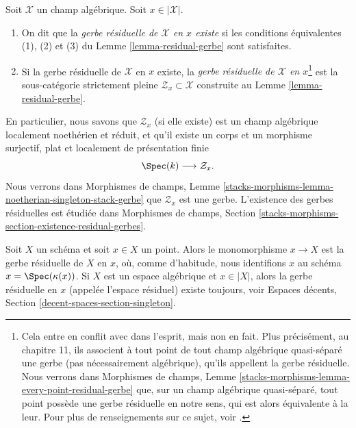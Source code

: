 \begin{definition}
\label{definition-residual-gerbe}
Soit $\mathcal{X}$ un champ algébrique. Soit $x \in |\mathcal{X}|$.
\begin{enumerate}
\item On dit que la {\it gerbe résiduelle de $\mathcal{X}$ en $x$ existe}
si les conditions équivalentes (1), (2) et (3) du
Lemme \ref{lemma-residual-gerbe}
sont satisfaites.
\item Si la gerbe résiduelle de $\mathcal{X}$ en $x$ existe, la
{\it gerbe résiduelle de $\mathcal{X}$ en $x$}\footnote{Cela entre en conflit avec
\cite{LM-B} dans l'esprit, mais non en fait. Plus précisément, au chapitre 11, ils associent
à tout point de tout champ algébrique quasi-séparé une gerbe (pas nécessairement
algébrique), qu'ils appellent la gerbe résiduelle. Nous verrons dans
Morphismes de champs, Lemme
\ref{stacks-morphisms-lemma-every-point-residual-gerbe}
que, sur un champ algébrique quasi-séparé, tout point
possède une gerbe résiduelle en notre sens, qui est alors équivalente à la leur. Pour
plus de renseignements sur ce sujet, voir
\cite[Annexe B]{rydh_etale_devissage}.}
est la sous-catégorie strictement pleine
$\mathcal{Z}_x \subset \mathcal{X}$ construite au
Lemme \ref{lemma-residual-gerbe}.
\end{enumerate}
\end{definition}

\noindent
En particulier, nous savons que $\mathcal{Z}_x$ (si elle existe) est un
champ algébrique localement noethérien et réduit, et qu'il existe un
corps et un morphisme surjectif, plat et localement de présentation finie
$$
\Spec(k) \longrightarrow \mathcal{Z}_x.
$$
Nous verrons dans
Morphismes de champs, Lemme
\ref{stacks-morphisms-lemma-noetherian-singleton-stack-gerbe}
que $\mathcal{Z}_x$ est une gerbe. L'existence des gerbes résiduelles est
étudiée dans Morphismes de champs, Section
\ref{stacks-morphisms-section-existence-residual-gerbes}.

\begin{example}
\label{example-residual-gerbe}
Soit $X$ un schéma et soit $x \in X$ un point. Alors le monomorphisme
$x \to X$ est la gerbe résiduelle de $X$ en $x$, où, comme d'habitude, nous identifions
$x$ au schéma $x = \Spec(\kappa(x))$. Si $X$ est un espace algébrique
et $x \in |X|$, alors la gerbe résiduelle en $x$ (appelée
l'espace résiduel) existe toujours, voir
Espaces décents, Section \ref{decent-spaces-section-singleton}.
\end{example}

